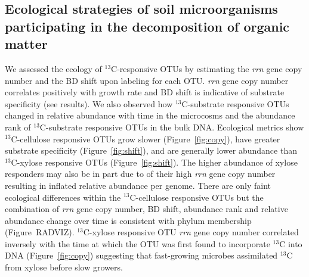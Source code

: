 \subsection{Ecological strategies of soil microorganisms participating in the
decomposition of organic matter}
We assessed the ecology of $^{13}$C-responsive OTUs by estimating the
\textit{rrn} gene copy number and the BD shift upon labeling for each OTU.
\textit{rrn} gene copy number correlates positively with growth rate
\citep{11125085} and BD shift is indicative of substrate specificity (see
results). We also observed how $^{13}$C-substrate responsive OTUs changed in
relative abundance with time in the microcosms and the abundance rank of
$^{13}$C-substrate responsive OTUs in the bulk DNA. Ecological metrics show
$^{13}$C-cellulose responsive OTUs grow slower (Figure~\ref{fig:copy}), have
greater substrate specificity (Figure~\ref{fig:shift}), and are generally lower
abundance than $^{13}$C-xylose responsive OTUs (Figure~\ref{fig:shift}). The
higher abundance of xylose responders may also be in part due to of their high
\textit{rrn} gene copy number resulting in inflated relative abundance per
genome. There are only faint ecological differences
within the $^{13}$C-cellulose responsive OTUs but the combination of
\textit{rrn} gene copy number, BD shift, abundance rank and relative abundance
change over time is consistent with phylum membership (Figure~RADVIZ).
$^{13}$C-xylose responsive OTU \textit{rrn} gene copy number correlated
inversely with the time at which the OTU was first found to incorporate
$^{13}$C into DNA (Figure~\ref{fig:copy}) suggesting that fast-growing microbes
assimilated $^{13}$C from xylose before slow growers.  

